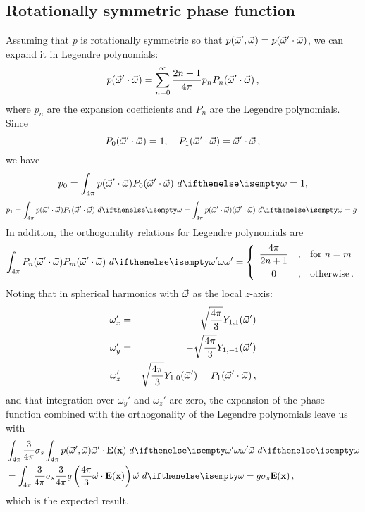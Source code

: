 \documentclass[10pt,a4paper]{article}
\begin{document}
\subsection{Rotationally symmetric phase function}
\label{sec:furtherderiv}
Assuming that $p$ is rotationally symmetric so that $p(\vec{\omega}', \vec{\omega}) = p(\vec{\omega}' \cdot \vec{\omega})$, we can expand it in Legendre polynomials:
$$
p(\vec{\omega}' \cdot \vec{\omega}) = \sum_{n = 0}^{\infty} \frac{2n+1}{4\pi} p_{n} P_n(\vec{\omega}' \cdot \vec{\omega}) \,,
$$
where $p_n$ are the expansion coefficients and $P_n$ are the Legendre polynomials. Since
$$
P_0(\vec{\omega}' \cdot \vec{\omega}) = 1, \quad P_1(\vec{\omega}' \cdot \vec{\omega}) = \vec{\omega}' \cdot \vec{\omega}  \, ,
$$
we have
$$
p_0 = \sphere{p(\omegavec' \cdot \omegavec) P_0(\omegavec' \cdot \omegavec)}{} = 1,
$$
$$
p_1 = \sphere{p(\omegavec' \cdot \omegavec) P_1(\omegavec' \cdot \omegavec)}{} = \sphere{p(\omegavec' \cdot \omegavec) (\omegavec' \cdot \omegavec)}{} = g \, .
$$
In addition, the orthogonality relations for Legendre polynomials are
$$
\sphere{P_n(\omegavec' \cdot \omegavec)P_m(\omegavec' \cdot \omegavec)}{\omega'} = \left\{\begin{array}{c@{\quad,\quad}l}\displaystyle\frac{4\pi}{2n+1} & \text{for $n=m$} \\[2ex] 0 & \text{otherwise} \, . \end{array} \right.
$$
Noting that in spherical harmonics with $\vec{\omega}$ as the local $z$-axis:
\begin{eqnarray*}
\omega_x' & = & -\sqrt{\frac{4\pi}{3}}Y_{1,1}(\vec{\omega}') \\
\omega_y' & = & -\sqrt{\frac{4\pi}{3}}Y_{1,-1}(\vec{\omega}') \\
\omega_z' & = & \sqrt{\frac{4\pi}{3}}Y_{1,0}(\vec{\omega}') = P_1(\vec{\omega}' \cdot \vec{\omega}) \, ,
\end{eqnarray*}
and that integration over $\omega_y'$ and $\omega_z'$ are zero, the expansion of the phase function combined with the orthogonality of the Legendre polynomials leave us with
\begin{equation*}
\begin{split}
&\sphere{ \frac{3}{4\pi} \scattering  \sphere {p(\omegavec', \omegavec)  \omegavec' \cdot \xvecfunc{E}}{\omega'} \omegavec}{} \\
&= \sphere{ \frac{3}{4\pi} \scattering \frac{3}{4\pi}g \left(\frac{4\pi}{3}\omegavec\cdot\xvecfunc{E}\right) \omegavec}{} = g \scattering  \xvecfunc{E} \, ,
\end{split}
\end{equation*}
which is the expected result.
\end{document}
